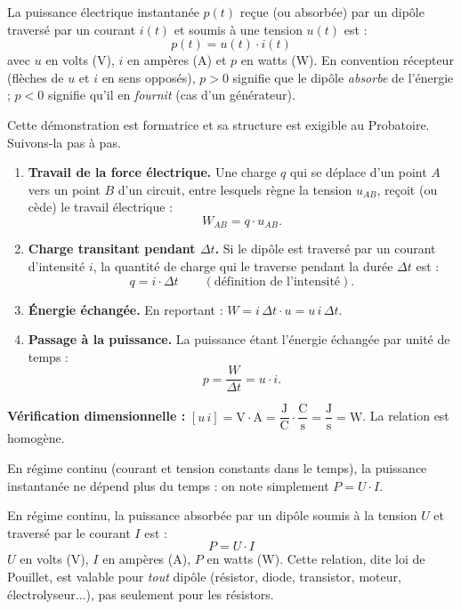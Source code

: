 \documentclass[11pt]{article}
\newcommand{\cle}[1]{{\popxbold\color{popdark}#1}}
\newcounter{popsec}
\newcounter{popsub}
\newcommand{\courssub}[1]{%
  \stepcounter{popsub}%
  \par\vspace{9pt}\noindent{\popxbold\fontsize{11.5}{13}\selectfont\color{popink}{\color{poporange}\thepopsec.\thepopsub}\hspace{6pt}#1}\par\nopagebreak\vspace{4pt}
}
\begin{document}
\begin{definition}
La \cle{puissance électrique instantanée} $p(t)$ reçue (ou absorbée) par un dipôle traversé par un courant $i(t)$ et soumis à une tension $u(t)$ est :
\[ p(t) = u(t)\cdot i(t) \]
avec $u$ en volts ($\mathrm{V}$), $i$ en ampères ($\mathrm{A}$) et $p$ en watts ($\mathrm{W}$). En convention récepteur (flèches de $u$ et $i$ en sens opposés), $p>0$ signifie que le dipôle \emph{absorbe} de l'énergie ; $p<0$ signifie qu'il en \emph{fournit} (cas d'un générateur).
\end{definition}

\begin{experience}[Démonstration guidée : de la définition du travail électrique à $p = u\,i$]
Cette démonstration est formatrice et sa structure est exigible au Probatoire. Suivons-la pas à pas.
\begin{enumerate}
\item \textbf{Travail de la force électrique.} Une charge $q$ qui se déplace d'un point $A$ vers un point $B$ d'un circuit, entre lesquels règne la tension $u_{AB}$, reçoit (ou cède) le travail électrique :
\[ W_{AB} = q\cdot u_{AB}. \]
\item \textbf{Charge transitant pendant $\Delta t$.} Si le dipôle est traversé par un courant d'intensité $i$, la quantité de charge qui le traverse pendant la durée $\Delta t$ est :
\[ q = i\cdot \Delta t \qquad (\text{définition de l'intensité}). \]
\item \textbf{Énergie échangée.} En reportant : $W = i\,\Delta t \cdot u = u\,i\,\Delta t$.
\item \textbf{Passage à la puissance.} La puissance étant l'énergie échangée par unité de temps :
\[ p = \frac{W}{\Delta t} = u\cdot i. \]
\end{enumerate}
\textbf{Vérification dimensionnelle :} $[u\,i] = \mathrm{V}\cdot\mathrm{A} = \dfrac{\mathrm{J}}{\mathrm{C}}\cdot\dfrac{\mathrm{C}}{\mathrm{s}} = \dfrac{\mathrm{J}}{\mathrm{s}} = \mathrm{W}$. La relation est homogène.
\end{experience}

\courssub{Régime continu : la loi de Pouillet}

En régime continu (courant et tension constants dans le temps), la puissance instantanée ne dépend plus du temps : on note simplement $P = U\cdot I$.

\begin{definition}
En régime continu, la \cle{puissance absorbée par un dipôle} soumis à la tension $U$ et traversé par le courant $I$ est :
\[ \boxed{P = U\cdot I} \]
$U$ en volts ($\mathrm{V}$), $I$ en ampères ($\mathrm{A}$), $P$ en watts ($\mathrm{W}$). Cette relation, dite \cle{loi de Pouillet}, est valable pour \emph{tout} dipôle (résistor, diode, transistor, moteur, électrolyseur...), pas seulement pour les résistors.
\end{definition}
\end{document}
